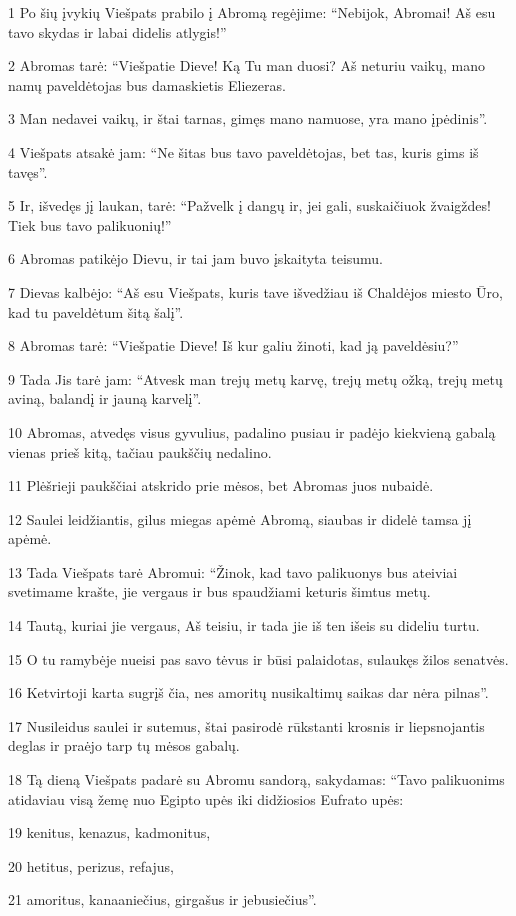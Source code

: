\par 1 Po šių įvykių Viešpats prabilo į Abromą regėjime: “Nebijok, Abromai! Aš esu tavo skydas ir labai didelis atlygis!” 
\par 2 Abromas tarė: “Viešpatie Dieve! Ką Tu man duosi? Aš neturiu vaikų, mano namų paveldėtojas bus damaskietis Eliezeras. 
\par 3 Man nedavei vaikų, ir štai tarnas, gimęs mano namuose, yra mano įpėdinis”. 
\par 4 Viešpats atsakė jam: “Ne šitas bus tavo paveldėtojas, bet tas, kuris gims iš tavęs”. 
\par 5 Ir, išvedęs jį laukan, tarė: “Pažvelk į dangų ir, jei gali, suskaičiuok žvaigždes! Tiek bus tavo palikuonių!” 
\par 6 Abromas patikėjo Dievu, ir tai jam buvo įskaityta teisumu. 
\par 7 Dievas kalbėjo: “Aš esu Viešpats, kuris tave išvedžiau iš Chaldėjos miesto Ūro, kad tu paveldėtum šitą šalį”. 
\par 8 Abromas tarė: “Viešpatie Dieve! Iš kur galiu žinoti, kad ją paveldėsiu?” 
\par 9 Tada Jis tarė jam: “Atvesk man trejų metų karvę, trejų metų ožką, trejų metų aviną, balandį ir jauną karvelį”. 
\par 10 Abromas, atvedęs visus gyvulius, padalino pusiau ir padėjo kiekvieną gabalą vienas prieš kitą, tačiau paukščių nedalino. 
\par 11 Plėšrieji paukščiai atskrido prie mėsos, bet Abromas juos nubaidė. 
\par 12 Saulei leidžiantis, gilus miegas apėmė Abromą, siaubas ir didelė tamsa jį apėmė. 
\par 13 Tada Viešpats tarė Abromui: “Žinok, kad tavo palikuonys bus ateiviai svetimame krašte, jie vergaus ir bus spaudžiami keturis šimtus metų. 
\par 14 Tautą, kuriai jie vergaus, Aš teisiu, ir tada jie iš ten išeis su dideliu turtu. 
\par 15 O tu ramybėje nueisi pas savo tėvus ir būsi palaidotas, sulaukęs žilos senatvės. 
\par 16 Ketvirtoji karta sugrįš čia, nes amoritų nusikaltimų saikas dar nėra pilnas”. 
\par 17 Nusileidus saulei ir sutemus, štai pasirodė rūkstanti krosnis ir liepsnojantis deglas ir praėjo tarp tų mėsos gabalų. 
\par 18 Tą dieną Viešpats padarė su Abromu sandorą, sakydamas: “Tavo palikuonims atidaviau visą žemę nuo Egipto upės iki didžiosios Eufrato upės: 
\par 19 kenitus, kenazus, kadmonitus, 
\par 20 hetitus, perizus, refajus, 
\par 21 amoritus, kanaaniečius, girgašus ir jebusiečius”.



